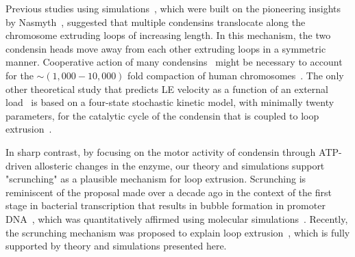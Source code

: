 \documentclass[fleqn,10pt]{wlscirep}
\begin{document}
Previous studies using simulations~\cite{fudenberg2016formation,alipour2012self,goloborodko2016compaction}, which were built on the pioneering insights by Nasmyth~\cite{nasmyth2001disseminating}, suggested that multiple condensins  translocate along the chromosome extruding loops of increasing length.  In this mechanism, the two condensin heads move away from each other extruding loops in a symmetric manner. Cooperative action of many condensins~\cite{kim2020dna} might be necessary to account for the $\sim (1,000 - 10,000)$ fold compaction of human chromosomes~\cite{banigan2019limits}. The only other theoretical study that predicts LE velocity as a function of an external load~\cite{marko2019dna} is based on a four-state stochastic kinetic model, with minimally twenty parameters, for the catalytic cycle of the condensin that is coupled to loop extrusion~\cite{marko2019dna}. %

In sharp contrast, by focusing on the motor activity of condensin through ATP-driven allosteric changes in the enzyme, our theory and simulations support   "scrunching" as a plausible mechanism for  loop extrusion.  Scrunching  is reminiscent of the proposal made over a decade ago in the context of the first stage in bacterial transcription that results  in bubble formation in promoter DNA~\cite{kapanidis2006initial}, which was quantitatively affirmed using molecular simulations~\cite{chen2010promoter}. Recently, the scrunching mechanism was proposed to explain loop extrusion~\cite{ryu2020condensin}, which is fully supported by  theory and simulations presented here.
\end{document}
